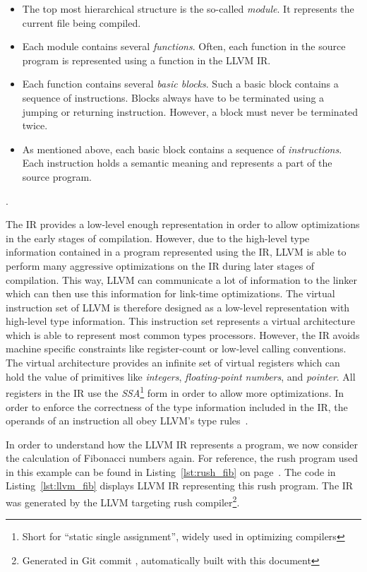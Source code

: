 \begin{itemize}
	\item The top most hierarchical structure is the so-called \emph{module}.
	      It represents the current file being compiled.
	\item Each module contains several \emph{functions}.
	      Often, each function in the source program is represented using a function in the LLVM IR.
	\item Each function contains several \emph{basic blocks}.
	      Such a basic block contains a sequence of instructions.
	      Blocks always have to be terminated using a jumping or returning instruction.
	      However, a block must never be terminated twice.
	\item As mentioned above, each basic block contains a sequence of \emph{instructions}.
	      Each instruction holds a semantic meaning and represents a part of the source program.
\end{itemize} \cite[p.~211-213]{Hsu2021-ez}.

The IR provides a low-level enough representation in order to allow optimizations in the early stages of compilation.
However, due to the high-level type information contained in a program represented using the IR,
LLVM is able to perform many aggressive optimizations on the IR during later stages of compilation.
This way, LLVM can communicate a lot of information to the linker which can then use this information for link-time optimizations.
The virtual instruction set of LLVM is therefore designed as a low-level representation with high-level type information.
This instruction set represents a virtual architecture which is able to represent most common types processors.
However, the IR avoids machine specific constraints like register-count or low-level calling conventions.
The virtual architecture provides an infinite set of virtual registers which can hold the value of primitives like \emph{integers}, \emph{floating-point numbers}, and \emph{pointer}.
All registers in the IR use the \emph{SSA}\footnote{Short for \enquote{static single assignment}, widely used in optimizing compilers} form in order to allow more optimizations.
In order to enforce the correctness of the type information included in the IR,
the operands of an instruction all obey LLVM's type rules~\cite[p.~14-17]{Lattner:MSThesis02}.

In order to understand how the LLVM IR represents a program, we now consider the calculation of Fibonacci numbers again.
For reference, the rush program used in this example can be found in Listing~\ref{lst:rush_fib} on page~\pageref{lst:rush_fib}.
The code in Listing~\ref{lst:llvm_fib} displays LLVM IR representing this rush program.
The IR was generated by the LLVM targeting rush compiler\footnote{Generated in Git commit \rushCommit, automatically built with this document}.

